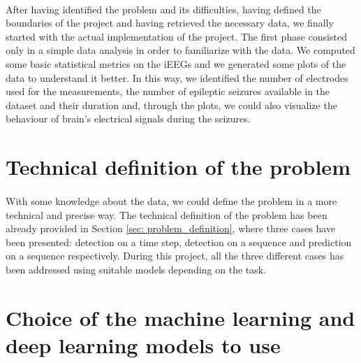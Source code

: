 \paragraph{} After having identified the problem and its difficulties, having defined the boundaries of the project and having retrieved the necessary data, we finally started with the actual implementation of the project. The first phase consisted only in a simple data analysis in order to familiarize with the data. We computed some basic statistical metrics on the iEEGs and we generated some plots of the data to understand it better. In this way, we identified the number of electrodes used for the measurements, the number of epileptic seizures available in the dataset and their duration and, through the plots, we could also visualize the behaviour of brain's electrical signals during the seizures.


\section{Technical definition of the problem} \label{sec: step_technical_definition_problem}
\paragraph{} With some knowledge about the data, we could define the problem in a more technical and precise way. The technical definition of the problem has been already provided in Section \ref{sec: problem_definition}, where three cases have been presented: detection on a time step, detection on a sequence and prediction on a sequence respectively. During this project, all the three different cases has been addressed using suitable models depending on the task.


\section{Choice of the machine learning and deep learning models to use} \label{sec: step_choice_models_to_use}
